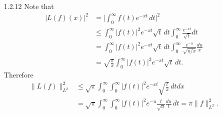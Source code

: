 \begin{enumerate}
   (b) Due to the uniform continuity, we choose $\delta>0$ 
   so that $|f(x)-f(x-t)|<\varepsilon$ for $|t|\leq\delta$. 
   Now for large $k$, we have
   \begin{equation*}\begin{aligned}
   |(Q_{k}*f-f)(x)| &= \bigg|\int_{-1}^{1}(f(x-t)-f(x))Q_{k}(t)\,dt\bigg|\\
   &\leq \int_{|t|\leq\delta}|f(x)-f(x-t)|Q_{k}(t)\,dt\\
   &\quad+ \int_{|t|>\delta}Q_{k}(t)|f(x)-f(x-t)|\,dt\\
   &\leq \varepsilon \norm{Q_{k}}_{L^1} + \varepsilon \sup_{x \in \R}{f(x)}\\
   &= \varepsilon\big(1+\sup\limits_{x \in \R}{f(x)}\big),
   \end{aligned}\end{equation*}
   and note that the tending to $0$ does not depend on the choice of $\delta$.
   
   (c)\&(d) Set $g(t)=f(t)-f(-1)-\dfrac{t+1}{2}(f(1)-f(-1))$, 
   then $g(-1)=g(1)=0$. 
   $g$ can be viewed as satisfying the condition in (c) 
   by zero extension outside $[-1,1]$. Thus $g*Q_k \to g$ uniformly. 
   However, also note that this means
   \[g*Q_k + f(-1) + \frac{x+1}{2}(f(1)-f(-1)) \to f\]
   uniformly on $[-1,1]$, and $g*Q_k(x)$ is a polynomial in $x$, since
   \begin{equation*}\begin{aligned}
   g*Q_k(x) &= \int_{-1}^{1} g(t)c_k(1-(x-t)^2)^k\,dt\\
   &=\sum_{j=0}^{2k}\bigg(\int_{-1}^1 g(t)d_{j,k}t^j\,dt\bigg)x^j.
   \end{aligned}\end{equation*}

\item[1.2.12]
Note that
\begin{align*}|L(f)(x)|^2&=\bigg|\int_0^\infty f(t)e^{-xt}\,dt\bigg|^2\\
&\leq\int_0^\infty|f(t)|^2e^{-xt}\sqrt{t}\,dt\int_0^\infty\frac{e^{-xt}}{\sqrt{t}}dt\\
&=\int_0^\infty|f(t)|^2e^{-xt}\sqrt{t}\,dt\int_0^\infty\frac{e^{-u}}{\sqrt{u/x}}\frac{du}{x}\\
&=\sqrt{\frac{\pi}{x}}\int_0^\infty|f(t)|^2e^{-xt}\sqrt{t}\,dt.\end{align*}
Therefore
    \begin{align*}\|L(f)\|_{L^2}^2
    &\leq\sqrt{\pi}\int_0^\infty\int_0^\infty|f(t)|^2e^{-xt}\sqrt{\frac{t}{x}}\,dtdx\\
    &=\sqrt{\pi}\int_0^\infty\int_0^\infty|f(t)|^2e^{-u}\frac{t}{\sqrt{u}}\frac{du}{t}\,dt
    =\pi\|f\|_{L^2}^2.\end{align*}
    

\end{enumerate}
